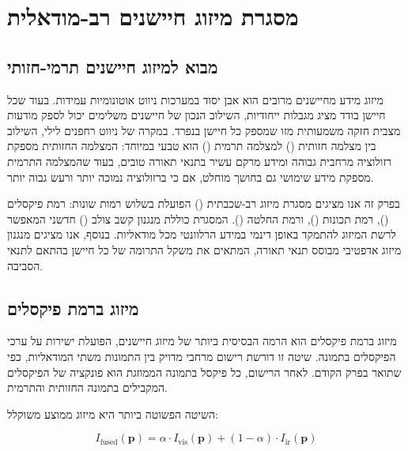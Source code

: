
\section{מסגרת מיזוג חיישנים רב-מודאלית}
\label{sec:ch05_fusion}

\subsection{מבוא למיזוג חיישנים תרמי-חזותי}
\label{sec:ch05_intro}

מיזוג מידע מחיישנים מרובים הוא אבן יסוד במערכות ניווט אוטונומיות עמידות. בעוד שכל חיישן בודד מציג מגבלות ייחודיות, השילוב הנכון של חיישנים משלימים יכול לספק מודעות מצבית חזקה משמעותית מזו שמספק כל חיישן בנפרד. במקרה של ניווט רחפנים לילי, השילוב בין מצלמה חזותית () למצלמה תרמית () הוא טבעי במיוחד: המצלמה החזותית מספקת רזולוציה מרחבית גבוהה ומידע מרקם עשיר בתנאי תאורה טובים, בעוד שהמצלמה התרמית מספקת מידע שימושי גם בחושך מוחלט, אם כי ברזולוציה נמוכה יותר ורעש גבוה יותר.

בפרק זה אנו מציגים מסגרת מיזוג רב-שכבתית () הפועלת בשלוש רמות שונות: רמת פיקסלים (), רמת תכונות (), ורמת החלטה (). המסגרת כוללת מנגנון קשב צולב () חדשני המאפשר לרשת המיזוג להתמקד באופן דינמי במידע הרלוונטי מכל מודאליות. בנוסף, אנו מציגים מנגנון מיזוג אדפטיבי מבוסס תנאי תאורה, המתאים את משקל התרומה של כל חיישן בהתאם לתנאי הסביבה.

\subsection{מיזוג ברמת פיקסלים}
\label{sec:ch05_pixel_fusion}

מיזוג ברמת פיקסלים הוא הרמה הבסיסית ביותר של מיזוג חיישנים, הפועלת ישירות על ערכי הפיקסלים בתמונה. שיטה זו דורשת רישום מרחבי מדויק בין התמונות משתי המודאליות, כפי שתואר בפרק הקודם. לאחר הרישום, כל פיקסל בתמונה הממוזגת הוא פונקציה של הפיקסלים המקבילים בתמונה החזותית והתרמית.

השיטה הפשוטה ביותר היא מיזוג ממוצע משוקלל:

\begin{equation}
I_{\text{fused}}(\mathbf{p}) = \alpha \cdot I_{\text{vis}}(\mathbf{p}) + (1 - \alpha) \cdot I_{\text{ir}}(\mathbf{p})
\label{eq:ch05_weighted_average}
\end{equation}

